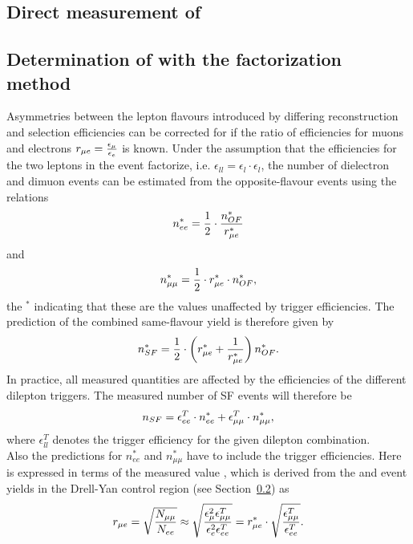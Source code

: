 \subsection{Direct measurement of \Rsfof}

\subsection{Determination of \Rsfof with the factorization method}
\label{sec:rmue}
Asymmetries between the lepton flavours introduced by differing reconstruction and selection efficiencies can be corrected for if the ratio of efficiencies for muons and electrons $r_{\mu e} = \frac{\epsilon_{\mu}}{\epsilon_{e}}$ is known. Under the assumption that the efficiencies for the two leptons in the event factorize, i.e. $\epsilon_{ll} = \epsilon_{l}\cdot\epsilon_{l}$, the number of dielectron and dimuon events can be estimated from the opposite-flavour events using the relations
\begin{equation}
n_{ee}^{*} = \frac{1}{2}\cdot \frac{n_{OF}^{*}}{r_{\mu e}^{*}}
\end{equation}
and 
\begin{equation}
n_{\mu\mu}^{*} = \frac{1}{2} \cdot r_{\mu e}^{*} \cdot n_{OF}^{*},
\end{equation}
the $^{*}$ indicating that these are the values unaffected by trigger efficiencies.
The prediction of the combined same-flavour yield is therefore given by
\begin{equation}
n_{SF}^{*} = \frac{1}{2}\cdot \left( r_{\mu e}^{*} + \frac{1}{r_{\mu e}^{*}} \right) n_{OF}^{*}.
\end{equation}
In practice, all measured quantities are affected by the efficiencies of the different dilepton triggers. The measured number of SF events will therefore be
\begin{equation}
n_{SF} = \epsilon_{ee}^T \cdot n_{ee}^{*} + \epsilon_{\mu\mu}^T \cdot n_{\mu\mu}^{*},
\end{equation}
where $\epsilon_{ll}^T$ denotes the trigger efficiency for the given dilepton combination.\\
Also the predictions for $n_{ee}^{*}$ and $n_{\mu\mu}^{*}$ have to include the trigger efficiencies. Here \rmuestar is expressed in terms of the measured value \rmue, which is derived from the \EE and \MM event yields in the Drell-Yan control region (see Section~\ref{sec:rmue}) as 
\begin{equation}
r_{\mu e}  = \sqrt{\frac{N_{\mu\mu}}{N_{ee}}} \approx \sqrt{\frac{\epsilon_{\mu}^2 \epsilon_{\mu\mu}^T}{\epsilon_{e}^2 \epsilon_{ee}^T}} = r_{\mu e}^{*} \cdot \sqrt{\frac{\epsilon_{\mu\mu}^T}{\epsilon_{ee}^T}}.
\end{equation}
